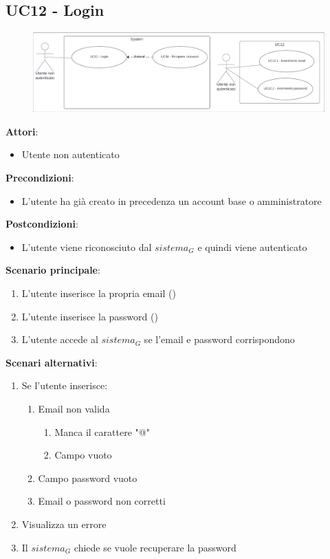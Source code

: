 \subsection{UC12 - Login} \label{usecase:12}
\begin{figure}[H]
    \centering
    \includegraphics[width=0.9\linewidth]{ucd/ucd12.png}
\end{figure}
\textbf{Attori}:
\begin{itemize}
    \item Utente non autenticato
\end{itemize}
\textbf{Precondizioni}:
\begin{itemize}
    \item L'utente ha già creato in precedenza un account base o amministratore
\end{itemize}
\textbf{Postcondizioni}:
\begin{itemize}
    \item L'utente viene riconosciuto dal $\textit{sistema}_G$ e quindi viene autenticato
\end{itemize}
\textbf{Scenario principale}:
\begin{enumerate}
    \item L'utente inserisce la propria email ()
    \item L'utente inserisce la password ()
    \item L'utente accede al $\textit{sistema}_G$ se l'email e password corrispondono
\end{enumerate}
\textbf{Scenari alternativi}:
\begin{enumerate}
    \item Se l'utente inserisce:
    \begin{enumerate}
        \item Email non valida
        \begin{enumerate}
            \item Manca il carattere "@"
            \item Campo vuoto
        \end{enumerate}
        \item Campo password vuoto
        \item Email o password non corretti
    \end{enumerate}
    \item Visualizza un errore
    \item Il $\textit{sistema}_G$ chiede se vuole recuperare la password
\end{enumerate}